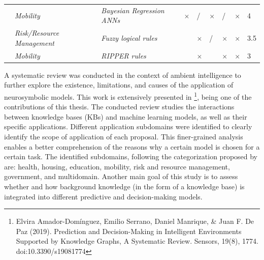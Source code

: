 \begin{table}
{\begin{tabular}{M{3.5cm}M{2.2cm}M{4cm}M{.5cm}M{.5cm}M{.5cm}M{.5cm}M{.5cm}M{1.5cm}}
\cite{siimobility-parking,siimobility-consult,siimobility-journal}        & \textit{Mobility}                 & \textit{Bayesian Regression ANNs} \citep{brann1,brann2,brann3}                                     &$\times$                    & /                         &$\times$                               & /                                 &$\times$                        & 4                      \\
\cite{xuandli}           & \textit{Risk/Resource Management} & \textit{Fuzzy logical rules}                                         &                      &$\times$                         & /                               &$\times$                                 &$\times$                        & 3.5                    \\ 
\cite{zavalaetal}       & \textit{Mobility}                 & \textit{RIPPER rules} \citep{ripper}                                                &                      &$\times$                         &                                 &$\times$                                 &$\times$                        & 3                      \\ \bottomrule

\end{tabular}
}
\end{table}
A systematic review was conducted in the context of ambient intelligence to further explore the existence, limitations, and causes of the application of neurosymbolic models. This work is extensively presented in \cite{amador_systematic_review_2019}\footnote{Elvira Amador-Domínguez, Emilio Serrano, Daniel Manrique, & Juan F. De Paz (2019). Prediction and Decision-Making in Intelligent Environments Supported by Knowledge Graphs, A Systematic Review. Sensors, 19(8), 1774. doi:10.3390/s19081774}, being one of the contributions of this thesis. The conducted review studies the interactions between knowledge bases (KBs) and machine learning models, as well as their specific applications. Different application subdomains were identified to clearly identify the scope of application of each proposal. This finer-grained analysis enables a better comprehension of the reasons why a certain model is chosen for a certain task. The identified subdomains, following the categorization proposed by \cite{ahmedetal} are: health, housing, education, mobility, risk and resource management, government, and multidomain. Another main goal of this study is to assess whether and how background knowledge (in the form of a knowledge base) is integrated into different predictive and decision-making models.

